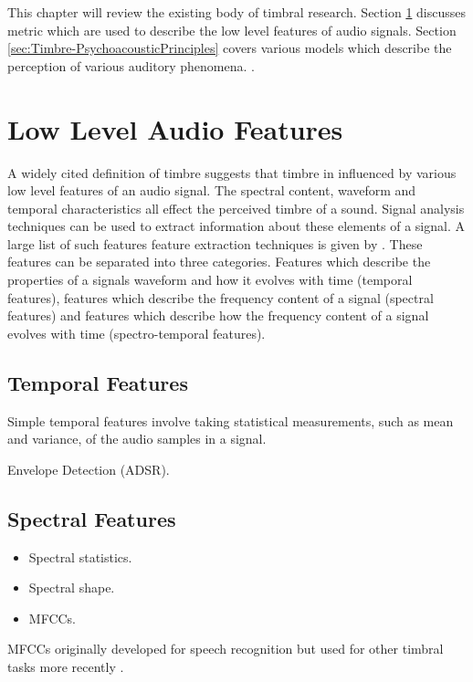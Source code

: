 	This chapter will review the existing body of timbral research. Section \ref{sec:Timbre-LowLevelFeatures} discusses
	metric which are used to describe the low level features of audio signals. Section
	\ref{sec:Timbre-PsychoacousticPrinciples} covers various models which describe the perception of various auditory
	phenomena. .

\section{Low Level Audio Features}
\label{sec:Timbre-LowLevelFeatures}
	A widely cited definition of timbre \citep{ASA1960american} suggests that timbre in influenced by various low level
	features of an audio signal. The spectral content, waveform and temporal characteristics all effect the perceived
	timbre of a sound. Signal analysis techniques can be used to extract information about these elements of a signal.
	A large list of such features feature extraction techniques is given by \citep{peeters2004a}. These features can be
	separated into three categories. Features which describe the properties of a signals waveform and how it evolves
	with time (temporal features), features which describe the frequency content of a signal (spectral features) and
	features which describe how the frequency content of a signal evolves with time (spectro-temporal features).

	\subsection{Temporal Features}
	\label{sec:Timbre-LowLevelFeatures-Temporal}
		Simple temporal features involve taking statistical measurements, such as mean and variance, of the audio
		samples in a signal. 

		\note
		{
			Envelope Detection (ADSR).
		}

	\subsection{Spectral Features}
	\label{sec:Timbre-LowLevelFeatures-Spectral}
		\note
		{
			\begin{itemize}
				\item Spectral statistics.
				\item Spectral shape.
				\item MFCCs.
			\end{itemize}

			MFCCs originally developed for speech recognition \citep{davis1980comparison} but used for other
			timbral tasks more recently \citep{depoli1997sonological}.
		}

